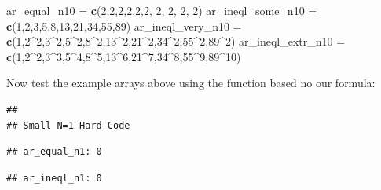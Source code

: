 \documentclass[
]{book}
\newenvironment{Shaded}{\begin{snugshade}}{\end{snugshade}}
\newcommand{\DecValTok}[1]{\textcolor[rgb]{0.00,0.00,0.81}{#1}}
\newcommand{\KeywordTok}[1]{\textcolor[rgb]{0.13,0.29,0.53}{\textbf{#1}}}
\newcommand{\NormalTok}[1]{#1}
\newcommand{\OperatorTok}[1]{\textcolor[rgb]{0.81,0.36,0.00}{\textbf{#1}}}
\newcommand{\StringTok}[1]{\textcolor[rgb]{0.31,0.60,0.02}{#1}}
\begin{document}
\begin{Shaded}
\begin{Highlighting}[]
\NormalTok{ar\_equal\_n10 =}\StringTok{ }\KeywordTok{c}\NormalTok{(}\DecValTok{2}\NormalTok{,}\DecValTok{2}\NormalTok{,}\DecValTok{2}\NormalTok{,}\DecValTok{2}\NormalTok{,}\DecValTok{2}\NormalTok{,}\DecValTok{2}\NormalTok{, }\DecValTok{2}\NormalTok{, }\DecValTok{2}\NormalTok{, }\DecValTok{2}\NormalTok{, }\DecValTok{2}\NormalTok{)}
\NormalTok{ar\_ineql\_some\_n10 =}\StringTok{ }\KeywordTok{c}\NormalTok{(}\DecValTok{1}\NormalTok{,}\DecValTok{2}\NormalTok{,}\DecValTok{3}\NormalTok{,}\DecValTok{5}\NormalTok{,}\DecValTok{8}\NormalTok{,}\DecValTok{13}\NormalTok{,}\DecValTok{21}\NormalTok{,}\DecValTok{34}\NormalTok{,}\DecValTok{55}\NormalTok{,}\DecValTok{89}\NormalTok{)}
\NormalTok{ar\_ineql\_very\_n10 =}\StringTok{ }\KeywordTok{c}\NormalTok{(}\DecValTok{1}\NormalTok{,}\DecValTok{2}\OperatorTok{\^{}}\DecValTok{2}\NormalTok{,}\DecValTok{3}\OperatorTok{\^{}}\DecValTok{2}\NormalTok{,}\DecValTok{5}\OperatorTok{\^{}}\DecValTok{2}\NormalTok{,}\DecValTok{8}\OperatorTok{\^{}}\DecValTok{2}\NormalTok{,}\DecValTok{13}\OperatorTok{\^{}}\DecValTok{2}\NormalTok{,}\DecValTok{21}\OperatorTok{\^{}}\DecValTok{2}\NormalTok{,}\DecValTok{34}\OperatorTok{\^{}}\DecValTok{2}\NormalTok{,}\DecValTok{55}\OperatorTok{\^{}}\DecValTok{2}\NormalTok{,}\DecValTok{89}\OperatorTok{\^{}}\DecValTok{2}\NormalTok{)}
\NormalTok{ar\_ineql\_extr\_n10 =}\StringTok{ }\KeywordTok{c}\NormalTok{(}\DecValTok{1}\NormalTok{,}\DecValTok{2}\OperatorTok{\^{}}\DecValTok{2}\NormalTok{,}\DecValTok{3}\OperatorTok{\^{}}\DecValTok{3}\NormalTok{,}\DecValTok{5}\OperatorTok{\^{}}\DecValTok{4}\NormalTok{,}\DecValTok{8}\OperatorTok{\^{}}\DecValTok{5}\NormalTok{,}\DecValTok{13}\OperatorTok{\^{}}\DecValTok{6}\NormalTok{,}\DecValTok{21}\OperatorTok{\^{}}\DecValTok{7}\NormalTok{,}\DecValTok{34}\OperatorTok{\^{}}\DecValTok{8}\NormalTok{,}\DecValTok{55}\OperatorTok{\^{}}\DecValTok{9}\NormalTok{,}\DecValTok{89}\OperatorTok{\^{}}\DecValTok{10}\NormalTok{)}
\end{Highlighting}
\end{Shaded}

Now test the example arrays above using the function based no our formula:

\begin{verbatim}
## 
## Small N=1 Hard-Code
\end{verbatim}

\begin{verbatim}
## ar_equal_n1: 0
\end{verbatim}

\begin{verbatim}
## ar_ineql_n1: 0
\end{verbatim}
\end{document}
